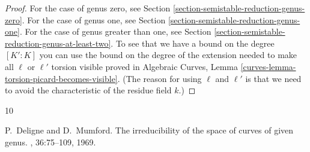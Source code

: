 \documentclass[10pt,a4paper]{amsart}
\theoremstyle{plain}
\theoremstyle{definition}
\theoremstyle{remark}
\numberwithin{equation}{subsection}
\begin{document}
\begin{proof}
For the case of genus zero, see
Section \ref{section-semistable-reduction-genus-zero}.
For the case of genus one, see
Section \ref{section-semistable-reduction-genus-one}.
For the case of genus greater than one, see
Section \ref{section-semistable-reduction-genus-at-least-two}.
To see that we have a bound on the degree $[K' : K]$
you can use the bound on the degree of the extension needed
to make all $\ell$ or $\ell'$ torsion visible proved in
Algebraic Curves, Lemma \ref{curves-lemma-torsion-picard-becomes-visible}.
(The reason for using $\ell$ and $\ell'$ is that we need to
avoid the characteristic of the residue field $k$.)
\end{proof}

\begin{thebibliography}{10}

P.~Deligne and D.~Mumford.
\newblock The irreducibility of the space of curves of given genus.
, 36:75--109, 1969.

\end{thebibliography}
\end{document}
